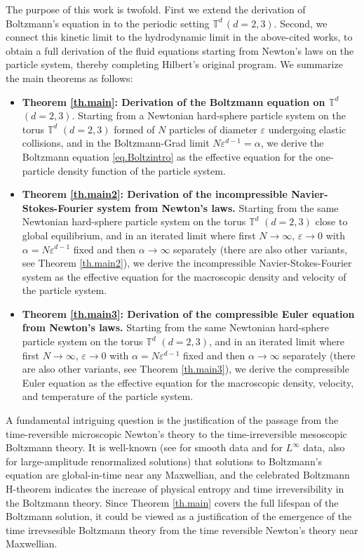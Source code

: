 \documentclass[10pt, reqno]{amsart}
\newcommand{\Tb}{\mathbb T}
\theoremstyle{definition}
\theoremstyle{remark}
\numberwithin{equation}{section}
\begin{document}
The purpose of this work is twofold. First we extend the derivation of Boltzmann's equation in \cite{DHM24} to the periodic setting $\Tb^d \,(d=2,3)$. Second, we connect this kinetic limit to the hydrodynamic limit in the above-cited works, to obtain a full derivation of the fluid equations starting from Newton's laws on the particle system, thereby completing Hilbert's original program. We summarize the main theorems as follows:
\begin{itemize}
\item {\bf Theorem \ref{th.main}: Derivation of the Boltzmann equation on $\Tb^d$ $(d=2,3)$}. Starting from a Newtonian hard-sphere particle system on the torus $\Tb^d$ $(d=2,3)$ formed of $N$ particles of diameter $\varepsilon$ undergoing elastic collisions, and in the Boltzmann-Grad limit $N\varepsilon^{d-1}=\alpha$, we derive the Boltzmann equation \eqref{eq.Boltzintro} as the effective equation for the one-particle density function of the particle system.
\item {\bf Theorem \ref{th.main2}: Derivation of the incompressible Navier-Stokes-Fourier system from Newton's laws.} Starting from the same Newtonian hard-sphere particle system on the torus $\Tb^d$ $(d=2,3)$ close to global equilibrium, and in an iterated limit where first $N\to\infty,\,\varepsilon\to 0$ with $\alpha=N\varepsilon^{d-1}$ fixed and then $\alpha\to \infty$ separately (there are also other variants, see Theorem \ref{th.main2}), we derive the incompressible Navier-Stokes-Fourier system as the effective equation for the macroscopic density and velocity of the particle system.
\item {\bf Theorem \ref{th.main3}: Derivation of the compressible Euler equation from Newton's laws.} Starting from the same Newtonian hard-sphere particle system on the torus $\Tb^d$ $(d=2,3)$, and in an iterated limit where first $N\to\infty,\,\varepsilon\to 0$ with $\alpha=N\varepsilon^{d-1}$ fixed and then $\alpha\to \infty$ separately (there are also other variants, see Theorem \ref{th.main3}), we derive the compressible Euler equation as the effective equation for the macroscopic density, velocity, and temperature of the particle system. 


\end{itemize}

A fundamental intriguing question is the justification of the passage from the time-reversible microscopic Newton's theory to the time-irreversible mesoscopic Boltzmann theory. It is well-known (see \cite{Uka74} for smooth data and \cite{Guo10} for $L^\infty$ data, also \cite{DL89} for large-amplitude renormalized solutions) that solutions to Boltzmann's equation are global-in-time near any Maxwellian, and the celebrated Boltzmann H-theorem indicates the increase of physical entropy and time irreversibility in the Boltzmann theory. Since Theorem \ref{th.main} covers the full lifespan of the Boltzmann solution, it could be viewed as a justification of the emergence of the time irrevsesible Boltzmann theory from the time reversible Newton's theory near Maxwellian.
\end{document}
